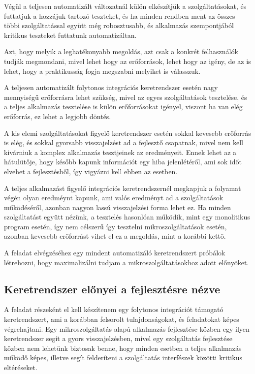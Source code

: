 \documentclass[11pt,magyar,a4paper,twoside,]{report}
\begin{document}
Végül a teljesen automatizált változatnál külön elkészítjük a
szolgáltatásokat, és futtatjuk a hozzájuk tartozó teszteket, és ha
minden rendben ment az összes többi szolgáltatással együtt még
robosztusabb, és alkalmazás szempontjából kritikus teszteket futtatunk
automatizáltan.

Azt, hogy melyik a leghatékonyabb megoldás, azt csak a konkrét
felhasználók tudják megmondani, mivel lehet hogy az erőforrások, lehet
hogy az igény, de az is lehet, hogy a praktikusság fogja megszabni
melyiket is válasszuk.

A teljesen automatizált folytonos integrációs keretrendszer esetén nagy
mennyiségű erőforrásra lehet szükség, mivel az egyes szolgáltatások
tesztelése, és a teljes alkalmazás tesztelése is külön erőforrásokat
igényel, viszont ha van elég erőforrás, ez lehet a legjobb döntés.

A kis elemi szolgáltatásokat figyelő keretrendszer esetén sokkal
kevesebb erőforrás is elég, és sokkal gyorsabb visszajelzést ad a
fejlesztő csapatnak, mivel nem kell kivárniuk a komplex alkalmazás
tesztjeinek az eredményeit. Ennek lehet az a hátulütője, hogy később
kapunk információt egy hiba jelenlétéről, ami sok időt elvehet a
fejlesztésből, így vigyázni kell ebben az esetben.

A teljes alkalmazást figyelő integrációs keretrendszernél megkapjuk a
folyamat végén olyan eredméynt kapunk, ami valós eredményt ad a
szolgáltatások működéséről, azonban nagyon lassú visszajelzési forma
lehet ez. Ha minden szolgáltatást együtt nézünk, a tesztelés hasonlóan
működik, mint egy monolitikus program esetén, így nem célszerű így
tesztelni mikroszolgáltatások esetén, azonban kevesebb erőforrást vihet
el ez a megoldás, mint a korábbi kettő.

A feladat elvégzéséhez egy mindent automatizáló keretrendszert próbálok
létrehozni, hogy maximalizálni tudjam a mikroszolgáltatásokhoz adott
előnyöket.

\subsection{Keretrendszer előnyei a fejlesztésre
nézve}\label{keretrendszer-elux151nyei-a-fejlesztuxe9sre-nuxe9zve}

A feladat részeként el kell készítenem egy folytonos integrációt
támogató keretrendszert, ami a korábban felsorolt tulajdonságokat, és
feladatokat képes végrehajtani. Egy mikroszolgáltatás alapú alkalmazás
fejlesztése közben egy ilyen keretrendszer segít a gyors
visszajelzésben, mivel egy szolgáltatás fejlesztése közben nem lehetünk
biztosak benne, hogy minden esetben a teljes alkalmazás működő képes,
illetve segít felderíteni a szolgáltatás interfészek közötti kritikus
eltéréseket.
\end{document}
